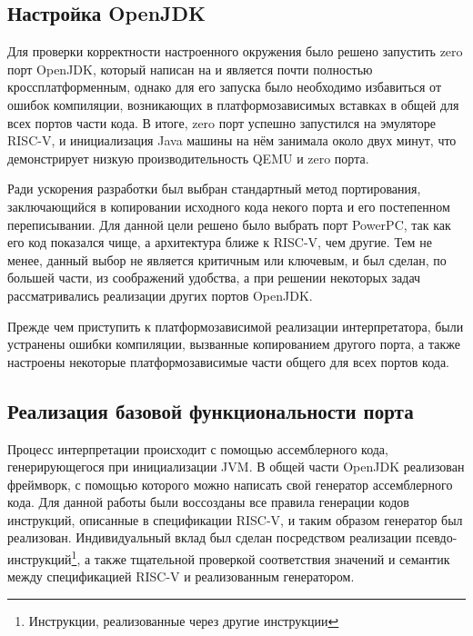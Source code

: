     
\subsection{Настройка OpenJDK}

Для проверки корректности настроенного окружения было решено запустить zero порт OpenJDK, который написан на \cpp и является почти полностью кроссплатформенным, однако для его запуска было необходимо избавиться от ошибок компиляции, возникающих в платформозависимых вставках в общей для всех портов части кода. В итоге, zero порт успешно запустился на эмуляторе RISC-V, и инициализация Java машины на нём занимала около двух минут, что демонстрирует низкую производительность QEMU и zero порта.


Ради ускорения разработки был выбран стандартный метод портирования, заключающийся в копировании исходного кода некого порта и его постепенном переписывании. Для данной цели решено было выбрать порт PowerPC, так как его код показался чище, а архитектура ближе к RISC-V, чем другие. Тем не менее, данный выбор не является критичным или ключевым, и был сделан, по большей части, из соображений удобства, а при решении некоторых задач рассматривались реализации других портов OpenJDK.

Прежде чем приступить к платформозависимой реализации интерпретатора, были устранены ошибки компиляции, вызванные копированием другого порта, а также настроены некоторые платформозависимые части общего для всех портов кода.


\subsection{Реализация базовой функциональности порта}

Процесс интерпретации происходит с помощью ассемблерного кода, генерирующегося при инициализации JVM. В общей части OpenJDK реализован фреймворк, с помощью которого можно написать свой генератор ассемблерного кода. Для данной работы были воссозданы все правила генерации кодов инструкций, описанные в спецификации RISC-V, и таким образом генератор был реализован. Индивидуальный вклад был сделан посредством реализации псевдо-инструкций\footnote{Инструкции, реализованные через другие инструкции}, а также тщательной проверкой соответствия значений и семантик между спецификацией RISC-V и реализованным генератором.

